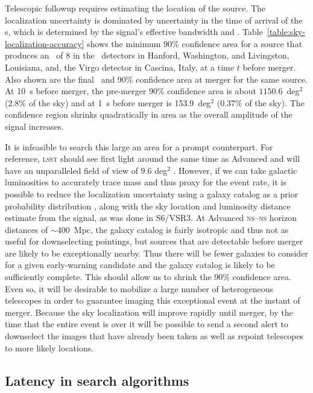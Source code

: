 Telescopic followup requires estimating the location of the \GW{} source. The
localization uncertainty is dominated by uncertainty in the time of arrival of
the \GW{}s, which is determined by the signal's effective bandwidth and \SNR{}
\citep{Fairhurst2009}.  Table~\ref{table:sky-localization-accuracy} shows the
minimum 90\% confidence area for a source that produces an \SNR\ of 8 in the
\LIGO\ detectors in Hanford, Washington, and Livingston, Louisiana, and, the
Virgo detector in Cascina, Italy, at a time $t$ before merger.  Also shown are
the final \SNR\ and 90\% confidence area at merger for the same source.
At 10~s before merger, the pre-merger 90\% confidence area is about $1150.6$~deg$^2$
(2.8\% of the sky) and at 1~s before merger is 153.9~deg$^2$ (0.37\% of the sky).
The confidence region shrinks quadratically in area as the overall amplitude of the
signal increases.

It is infeasible to search this large an area for a prompt counterpart. For
reference, \textsc{lsst} should see first light around the same time as
Advanced \LIGO{} and will have an unparalleled field of view of 9.6 deg$^2$
\citep{2008arXiv0805.2366I}.  However, if we can take galactic luminosities
to accurately trace mass and thus proxy
for the \CBC{} event rate, it is possible to reduce the localization
uncertainty using a galaxy catalog as a prior probability distribution
\citep{galaxy-catalog}, along with the sky location and luminosity distance
estimate from the \GW{} signal, as was done in S6/VSR3. At Advanced \LIGO{}
\textsc{ns}--\textsc{ns} horizon distances of $\sim$400~Mpc, the galaxy catalog
is fairly isotropic and thus not as useful for downselecting pointings, but
sources that are detectable before merger are likely to be exceptionally
nearby. Thus there will be fewer galaxies to consider for a given
early-warning candidate and the galaxy catalog is likely to be sufficiently
complete. This should allow us to shrink the 90\% confidence area.
Even so, it will be desirable to mobilize a large number of heterogeneous
telescopes in order to guarantee imaging this exceptional event at the instant
of merger. Because the sky localization will improve rapidly until merger,
by the time that the entire \CBC{} event is over it will be
possible to send a second alert to downselect the images that have already been
taken as well as repoint telescopes to more likely locations.

\subsection{Latency in \CBC{} search algorithms}

